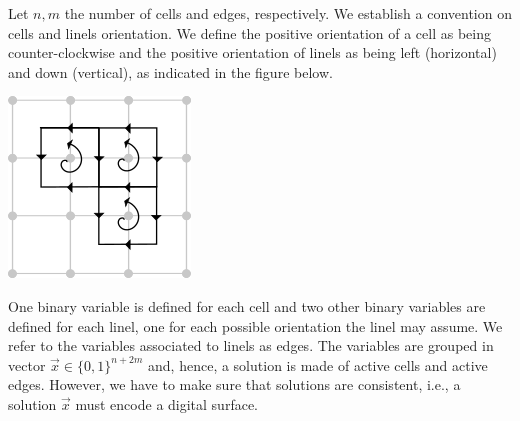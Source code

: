Let $n,m$ the number of cells and edges, respectively. We establish a convention on cells and linels orientation. We define the positive orientation of a cell as being counter-clockwise and the positive orientation of linels as being left (horizontal) and down (vertical), as indicated in the figure below. 

\begin{center}
\includegraphics[scale=0.6]{figures/chapter3/schoenemann/schoenemann_cell_linel_orientation.png}
\end{center}

One binary variable is defined for each cell and two other binary variables are defined for each linel, one for each possible orientation the linel may assume. We refer to the variables associated to linels as edges. The variables are grouped in  vector $\vec{x} \in \{0,1\}^{n+2m}$ and, hence, a solution is made of active cells and active edges. However, we have to make sure that solutions are consistent, i.e., a solution $\vec{x}$ must encode a digital surface. 

